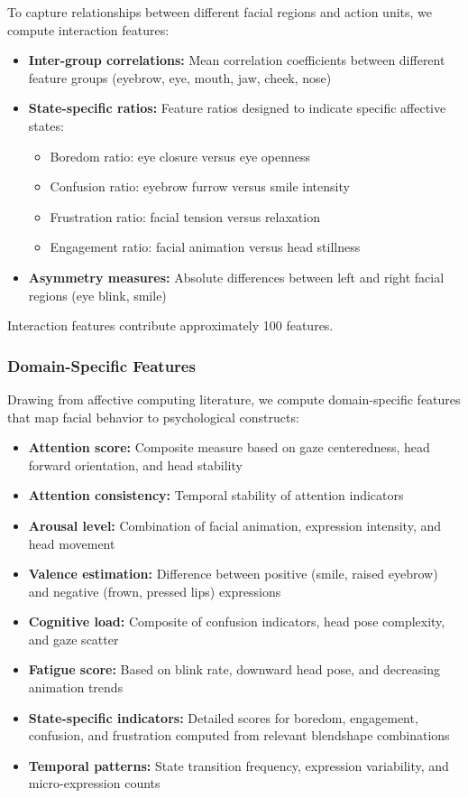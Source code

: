 \documentclass[11pt,a4paper]{article}
\begin{document}
To capture relationships between different facial regions and action units, we compute interaction features:

\begin{itemize}
    \item \textbf{Inter-group correlations:} Mean correlation coefficients between different feature groups (eyebrow, eye, mouth, jaw, cheek, nose)
    \item \textbf{State-specific ratios:} Feature ratios designed to indicate specific affective states:
    \begin{itemize}
        \item Boredom ratio: eye closure versus eye openness
        \item Confusion ratio: eyebrow furrow versus smile intensity
        \item Frustration ratio: facial tension versus relaxation
        \item Engagement ratio: facial animation versus head stillness
    \end{itemize}
    \item \textbf{Asymmetry measures:} Absolute differences between left and right facial regions (eye blink, smile)
\end{itemize}

Interaction features contribute approximately 100 features.


\subsubsection{Domain-Specific Features}

Drawing from affective computing literature, we compute domain-specific features that map facial behavior to psychological constructs:

\begin{itemize}
    \item \textbf{Attention score:} Composite measure based on gaze centeredness, head forward orientation, and head stability
    \item \textbf{Attention consistency:} Temporal stability of attention indicators
    \item \textbf{Arousal level:} Combination of facial animation, expression intensity, and head movement
    \item \textbf{Valence estimation:} Difference between positive (smile, raised eyebrow) and negative (frown, pressed lips) expressions
    \item \textbf{Cognitive load:} Composite of confusion indicators, head pose complexity, and gaze scatter
    \item \textbf{Fatigue score:} Based on blink rate, downward head pose, and decreasing animation trends
    \item \textbf{State-specific indicators:} Detailed scores for boredom, engagement, confusion, and frustration computed from relevant blendshape combinations
    \item \textbf{Temporal patterns:} State transition frequency, expression variability, and micro-expression counts
\end{itemize}
\end{document}
